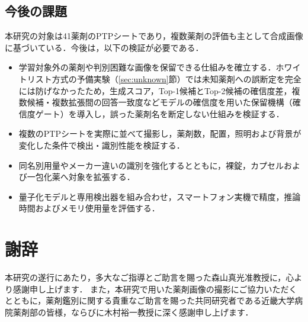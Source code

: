 \documentclass[dvipdfmx]{jsarticle}
\begin{document}
\subsection{今後の課題}

本研究の対象は41薬剤のPTPシートであり，複数薬剤の評価も主として合成画像に基づいている．今後は，以下の検証が必要である．

\begin{itemize}
  \item 学習対象外の薬剤や判別困難な画像を保留できる仕組みを確立する．ホワイトリスト方式の予備実験（\ref{sec:unknown}節）では未知薬剤への誤断定を完全には防げなかったため，生成スコア，Top-1候補とTop-2候補の確信度差，複数候補・複数拡張間の回答一致度などモデルの確信度を用いた保留機構（確信度ゲート）を導入し，誤った薬剤名を断定しない仕組みを検証する．
  \item 複数のPTPシートを実際に並べて撮影し，薬剤数，配置，照明および背景が変化した条件で検出・識別性能を検証する．
  \item 同名別用量やメーカー違いの識別を強化するとともに，裸錠，カプセルおよび一包化薬へ対象を拡張する．
  \item 量子化モデルと専用検出器を組み合わせ，スマートフォン実機で精度，推論時間およびメモリ使用量を評価する．
\end{itemize}

\newpage
\section*{謝辞}

本研究の遂行にあたり，多大なご指導とご助言を賜った森山真光准教授に，心より感謝申し上げます．
また，本研究で用いた薬剤画像の撮影にご協力いただくとともに，薬剤鑑別に関する貴重なご助言を賜った共同研究者である近畿大学病院薬剤部の皆様，ならびに木村裕一教授に深く感謝申し上げます．

\newpage
\end{document}
